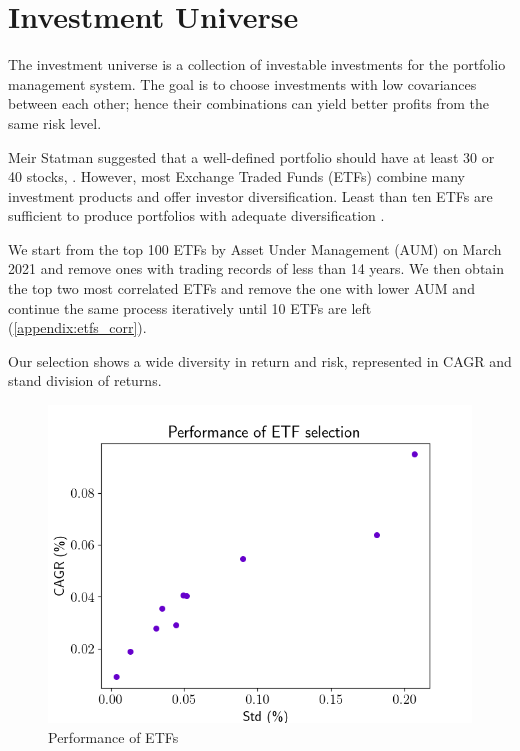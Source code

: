 \section{Investment Universe}
The investment universe is a collection of investable investments for the portfolio management system. The goal is to choose investments with low covariances between each other; hence their combinations can yield better profits from the same risk level\cite{willenbrock2011diversification}. 
\par 
Meir Statman suggested that a well-defined portfolio should have at least 30 or 40 stocks,  \cite{statman1987many}. However, most Exchange Traded Funds (ETFs) combine many investment products and offer investor diversification. Least than ten ETFs are sufficient to produce portfolios with adequate diversification \cite{chang_2016}.
\par
We start from the top 100 ETFs by Asset Under Management (AUM) on March 2021 and remove ones with trading records of less than 14 years. We then obtain the top two most correlated ETFs and remove the one with lower AUM and continue the same process iteratively until 10 ETFs are left (\autoref{appendix:etfs_corr}).
\par
Our selection shows a wide diversity in return and risk, represented in CAGR and stand division of returns. 
\begin{figure}[bth]
    \centering
    \includegraphics[width=12cm]{images/etfs.png}
    \caption{Performance of ETFs}
    \label{fig:efts}
\end{figure}